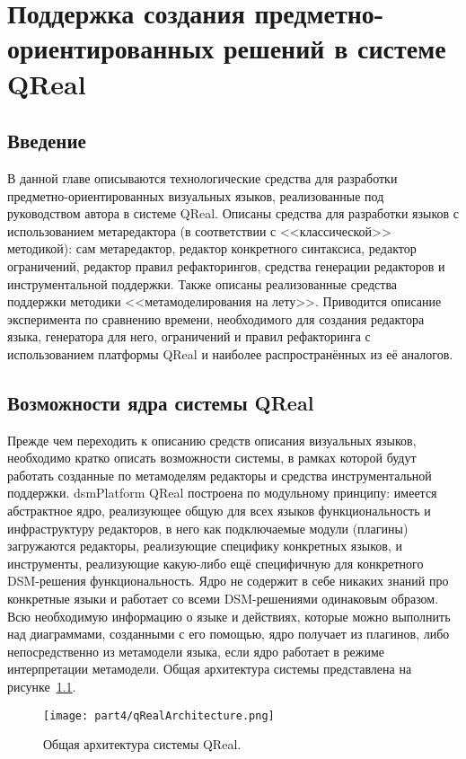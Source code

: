 \chapter{Поддержка создания предметно-ориентированных решений в системе QReal}
\label{chapter:implementation}

\section{Введение}
В данной главе описываются технологические средства для разработки предметно-ориентированных 
визуальных языков, реализованные под руководством автора в системе QReal. Описаны 
средства для разработки языков с использованием метаредактора (в соответствии с <<классической>> 
методикой): сам метаредактор, редактор конкретного синтаксиса, редактор ограничений, 
редактор правил рефакторингов, средства генерации редакторов и инструментальной поддержки. 
Также описаны реализованные средства поддержки методики <<метамоделирования на лету>>.
Приводится описание эксперимента по сравнению времени, необходимого для создания редактора
языка, генератора для него, ограничений и правил рефакторинга с использованием платформы QReal 
и наиболее распространённых из её аналогов.

\section{Возможности ядра системы QReal}
Прежде чем переходить к описанию средств описания визуальных языков, необходимо кратко 
описать возможности системы, в рамках которой будут работать созданные по метамоделям 
редакторы и средства инструментальной поддержки. \ac{dsmPlatform} QReal построена по 
модульному принципу: имеется абстрактное ядро, реализующее общую для всех языков функциональность 
и инфраструктуру редакторов, в него как подключаемые модули (плагины) загружаются редакторы, 
реализующие специфику конкретных языков, и инструменты, реализующие какую-либо ещё 
специфичную для конкретного \ac{DSM}-решения функциональность. Ядро не содержит в себе 
никаких знаний про конкретные языки и работает со всеми \ac{DSM}-решениями одинаковым образом. 
Всю необходимую информацию о языке и действиях, которые можно выполнить над диаграммами, 
созданными с его помощью, ядро получает из плагинов, либо непосредственно из метамодели 
языка, если ядро работает в режиме интерпретации метамодели. Общая архитектура системы 
представлена на рисунке~\ref{qRealArchitecture}.

\begin{figure} [ht]
	\begin{center}
		\texttt{[image: part4/qRealArchitecture.png]}
		\caption{Общая архитектура системы QReal.}
		\label{qRealArchitecture}
	\end{center}
\end{figure}

